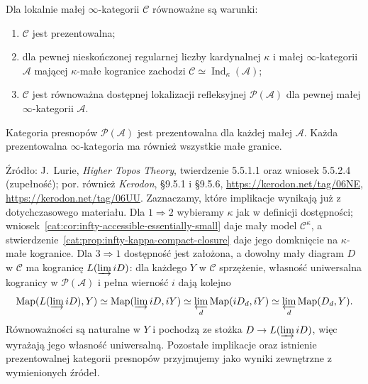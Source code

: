 \begin{twierdzenie}\label{cat:thm:infty-presentable-characterization}
Dla lokalnie małej $\infty$-kategorii $\mathcal C$ równoważne są warunki:
\begin{enumerate}
 \item $\mathcal C$ jest prezentowalna;
 \item dla pewnej nieskończonej regularnej liczby kardynalnej $\kappa$ i małej $\infty$-kategorii $\mathcal A$ mającej $\kappa$-małe kogranice zachodzi $\mathcal C\simeq\operatorname{Ind}_\kappa(\mathcal A)$;
 \item $\mathcal C$ jest równoważna dostępnej lokalizacji refleksyjnej $\mathcal P(\mathcal A)$ dla pewnej małej $\infty$-kategorii $\mathcal A$.
\end{enumerate}
Kategoria presnopów $\mathcal P(\mathcal A)$ jest prezentowalna dla każdej małej $\mathcal A$. Każda prezentowalna $\infty$-kategoria ma również wszystkie małe granice.
\end{twierdzenie}

Źródło: J.~Lurie, \emph{Higher Topos Theory}, twierdzenie 5.5.1.1 oraz wniosek 5.5.2.4 (zupełność); por. również \emph{Kerodon}, \S9.5.1 i \S9.5.6, \url{https://kerodon.net/tag/06NE}, \url{https://kerodon.net/tag/06UU}. Zaznaczamy, które implikacje wynikają już z dotychczasowego materiału. Dla $1\Rightarrow2$ wybieramy $\kappa$ jak w definicji dostępności; wniosek~\ref{cat:cor:infty-accessible-essentially-small} daje mały model $\mathcal C^\kappa$, a stwierdzenie~\ref{cat:prop:infty-kappa-compact-closure} daje jego domknięcie na $\kappa$-małe kogranice. Dla $3\Rightarrow1$ dostępność jest założona, a dowolny mały diagram $D$ w $\mathcal C$ ma kogranicę $L(\varinjlim iD)$: dla każdego $Y$ w $\mathcal C$ sprzężenie, własność uniwersalna kogranicy w $\mathcal P(\mathcal A)$ i pełna wierność $i$ dają kolejno
\[
 \operatorname{Map}(L(\varinjlim iD),Y)
 \simeq\operatorname{Map}(\varinjlim iD,iY)
 \simeq\varprojlim_d\operatorname{Map}(iD_d,iY)
 \simeq\varprojlim_d\operatorname{Map}(D_d,Y).
\]
Równoważności są naturalne w $Y$ i pochodzą ze stożka $D\to L(\varinjlim iD)$, więc wyrażają jego własność uniwersalną. Pozostałe implikacje oraz istnienie prezentowalnej kategorii presnopów przyjmujemy jako wyniki zewnętrzne z wymienionych źródeł.

